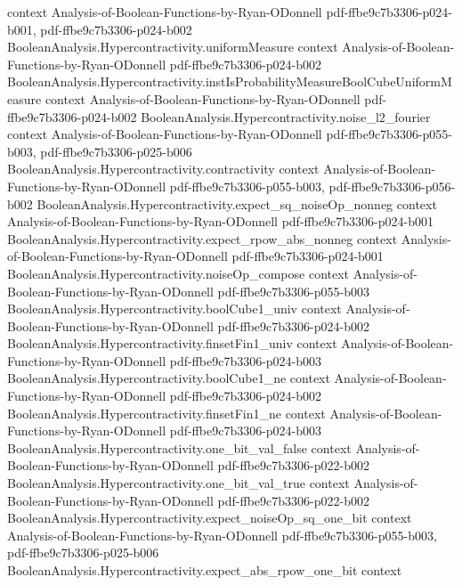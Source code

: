 \begin{theorem}
  {context}
  {Analysis-of-Boolean-Functions-by-Ryan-ODonnell}
  {pdf-ffbe9c7b3306-p024-b001,
    pdf-ffbe9c7b3306-p024-b002}
\proofstep
  {BooleanAnalysis.Hypercontractivity.uniformMeasure}
  {context}
  {Analysis-of-Boolean-Functions-by-Ryan-ODonnell}
  {pdf-ffbe9c7b3306-p024-b002}
\proofstep
  {BooleanAnalysis.Hypercontractivity.instIsProbabilityMeasureBoolCubeUniformMeasure}
  {context}
  {Analysis-of-Boolean-Functions-by-Ryan-ODonnell}
  {pdf-ffbe9c7b3306-p024-b002}
\proofstep
  {BooleanAnalysis.Hypercontractivity.noise_l2_fourier}
  {context}
  {Analysis-of-Boolean-Functions-by-Ryan-ODonnell}
  {pdf-ffbe9c7b3306-p055-b003,
    pdf-ffbe9c7b3306-p025-b006}
\proofstep
  {BooleanAnalysis.Hypercontractivity.contractivity}
  {context}
  {Analysis-of-Boolean-Functions-by-Ryan-ODonnell}
  {pdf-ffbe9c7b3306-p055-b003,
    pdf-ffbe9c7b3306-p056-b002}
\proofstep
  {BooleanAnalysis.Hypercontractivity.expect_sq_noiseOp_nonneg}
  {context}
  {Analysis-of-Boolean-Functions-by-Ryan-ODonnell}
  {pdf-ffbe9c7b3306-p024-b001}
\proofstep
  {BooleanAnalysis.Hypercontractivity.expect_rpow_abs_nonneg}
  {context}
  {Analysis-of-Boolean-Functions-by-Ryan-ODonnell}
  {pdf-ffbe9c7b3306-p024-b001}
\proofstep
  {BooleanAnalysis.Hypercontractivity.noiseOp_compose}
  {context}
  {Analysis-of-Boolean-Functions-by-Ryan-ODonnell}
  {pdf-ffbe9c7b3306-p055-b003}
\proofstep
  {BooleanAnalysis.Hypercontractivity.boolCube1_univ}
  {context}
  {Analysis-of-Boolean-Functions-by-Ryan-ODonnell}
  {pdf-ffbe9c7b3306-p024-b002}
\proofstep
  {BooleanAnalysis.Hypercontractivity.finsetFin1_univ}
  {context}
  {Analysis-of-Boolean-Functions-by-Ryan-ODonnell}
  {pdf-ffbe9c7b3306-p024-b003}
\proofstep
  {BooleanAnalysis.Hypercontractivity.boolCube1_ne}
  {context}
  {Analysis-of-Boolean-Functions-by-Ryan-ODonnell}
  {pdf-ffbe9c7b3306-p024-b002}
\proofstep
  {BooleanAnalysis.Hypercontractivity.finsetFin1_ne}
  {context}
  {Analysis-of-Boolean-Functions-by-Ryan-ODonnell}
  {pdf-ffbe9c7b3306-p024-b003}
\proofstep
  {BooleanAnalysis.Hypercontractivity.one_bit_val_false}
  {context}
  {Analysis-of-Boolean-Functions-by-Ryan-ODonnell}
  {pdf-ffbe9c7b3306-p022-b002}
\proofstep
  {BooleanAnalysis.Hypercontractivity.one_bit_val_true}
  {context}
  {Analysis-of-Boolean-Functions-by-Ryan-ODonnell}
  {pdf-ffbe9c7b3306-p022-b002}
\proofstep
  {BooleanAnalysis.Hypercontractivity.expect_noiseOp_sq_one_bit}
  {context}
  {Analysis-of-Boolean-Functions-by-Ryan-ODonnell}
  {pdf-ffbe9c7b3306-p055-b003,
    pdf-ffbe9c7b3306-p025-b006}
\proofstep
  {BooleanAnalysis.Hypercontractivity.expect_abs_rpow_one_bit}
  {context}

\end{theorem}
